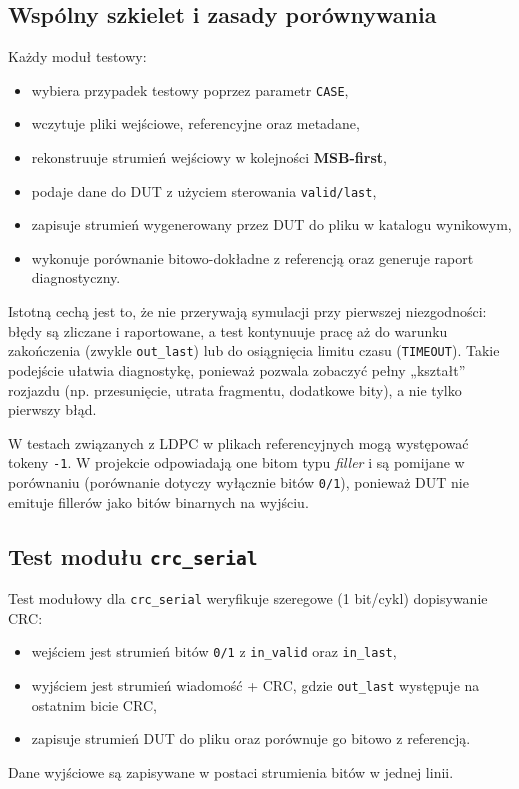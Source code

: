 \subsection{Wspólny szkielet  i zasady porównywania}
\label{subsec:tb_common_skeleton}

Każdy moduł testowy:
\begin{itemize}
    \item wybiera przypadek testowy poprzez parametr \texttt{CASE},
    \item wczytuje pliki wejściowe, referencyjne oraz metadane,
    \item rekonstruuje strumień wejściowy w kolejności \textbf{MSB-first},
    \item podaje dane do DUT z użyciem sterowania \texttt{valid/last},
    \item zapisuje strumień wygenerowany przez DUT do pliku w katalogu wynikowym,
    \item wykonuje porównanie bitowo-dokładne z referencją oraz generuje raport diagnostyczny.
\end{itemize}

Istotną cechą  jest to, że nie przerywają symulacji przy pierwszej niezgodności:
błędy są zliczane i raportowane, a test kontynuuje pracę aż do warunku zakończenia (zwykle \texttt{out\_last})
lub do osiągnięcia limitu czasu (\texttt{TIMEOUT}). Takie podejście ułatwia diagnostykę, ponieważ pozwala
zobaczyć pełny „kształt” rozjazdu (np. przesunięcie, utrata fragmentu, dodatkowe bity), a nie tylko pierwszy błąd.

W testach związanych z LDPC w plikach referencyjnych mogą występować tokeny \texttt{-1}.
W projekcie odpowiadają one bitom typu \emph{filler} i są pomijane w porównaniu (porównanie dotyczy wyłącznie bitów \texttt{0/1}),
ponieważ DUT nie emituje fillerów jako bitów binarnych na wyjściu.

\subsection{Test modułu \texttt{crc\_serial}}
\label{subsec:tb_crc_serial}

Test modułowy dla \texttt{crc\_serial} weryfikuje szeregowe (1 bit/cykl) dopisywanie CRC:
\begin{itemize}
    \item wejściem jest strumień bitów \texttt{0/1} z \texttt{in\_valid} oraz \texttt{in\_last},
    \item wyjściem jest strumień wiadomość + CRC, gdzie \texttt{out\_last} występuje na ostatnim bicie CRC,
    \item {} zapisuje strumień DUT do pliku oraz porównuje go bitowo z referencją.
\end{itemize}
Dane wyjściowe są zapisywane w postaci strumienia bitów w jednej linii.

